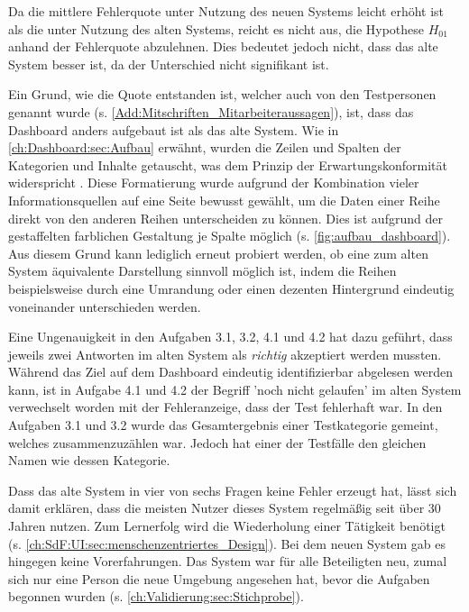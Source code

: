 \noindent
Da die mittlere Fehlerquote unter Nutzung des neuen Systems leicht erhöht ist als die unter Nutzung des alten Systems, reicht es nicht aus, die Hypothese $H_{01}$ anhand der Fehlerquote abzulehnen. Dies bedeutet jedoch nicht, dass das alte System besser ist, da der Unterschied nicht signifikant ist.

Ein Grund, wie die Quote entstanden ist, welcher auch von den Testpersonen genannt wurde (s. \autoref{Add:Mitschriften_Mitarbeiteraussagen}), ist, dass das Dash\-board anders aufgebaut ist als das alte System. Wie in \autoref{ch:Dashboard:sec:Aufbau} erwähnt, wurden die Zeilen und Spalten der Kategorien und Inhalte getauscht, was dem Prinzip der Erwartungskonformität widerspricht \cite{DIN_EN_ISO_9241-110}. Diese Formatierung wurde aufgrund der Kombination vieler Informationsquellen auf eine Seite bewusst gewählt, um die Daten einer Reihe direkt von den anderen Reihen unterscheiden zu können. Dies ist aufgrund der gestaffelten farblichen Gestaltung je Spalte möglich (s. \autoref{fig:aufbau_dashboard}). Aus diesem Grund kann lediglich erneut probiert werden, ob eine zum alten System äquivalente Darstellung sinnvoll möglich ist, indem die Reihen beispielsweise durch eine Umrandung oder einen dezenten Hintergrund eindeutig voneinander unterschieden werden.

Eine Ungenauigkeit in den Aufgaben 3.1, 3.2, 4.1 und 4.2 hat dazu geführt, dass jeweils zwei Antworten im alten System als \textit{richtig} akzeptiert werden mussten. Während das Ziel auf dem Dash\-board eindeutig identifizierbar abgelesen werden kann, ist in Aufgabe 4.1 und 4.2 der Begriff 'noch nicht gelaufen' im alten System verwechselt worden mit der Fehleranzeige, dass der Test fehlerhaft war. In den Aufgaben 3.1 und 3.2 wurde das Gesamtergebnis einer Testkategorie gemeint, welches zusammenzuzählen war. Jedoch hat einer der Testfälle den gleichen Namen wie dessen Kategorie. %

Dass das alte System in vier von sechs Fragen keine Fehler erzeugt hat, lässt sich damit erklären, dass die meisten Nutzer dieses System regelmäßig seit über 30 Jahren nutzen. Zum Lernerfolg wird die Wiederholung einer Tätigkeit benötigt (s. \autoref{ch:SdF:UI:sec:menschenzentriertes_Design}). Bei dem neuen System gab es hingegen keine Vorerfahrungen. Das System war für alle Beteiligten neu, zumal sich nur eine Person die neue Umgebung angesehen hat, bevor die Aufgaben begonnen wurden (s. \autoref{ch:Validierung:sec:Stichprobe}).

